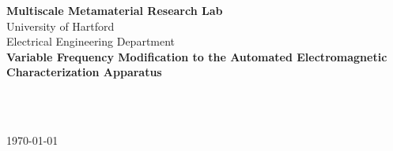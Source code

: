 \newcommand{\Space}{\\[.5cm]}
\begin{center}
	\textbf{\large Multiscale Metamaterial Research Lab} \Space
	University of Hartford \Space
	Electrical Engineering Department\\
	\vspace{\fill}
	\textbf{\Large Variable Frequency Modification to the Automated Electromagnetic Characterization Apparatus} \Space
	\vspace{\fill}
	\author[Kyle Eckert]{1}\\
	\author[Nicholas Krupa]{2}\\
	\today{} \Space
	
	
	
\end{center}